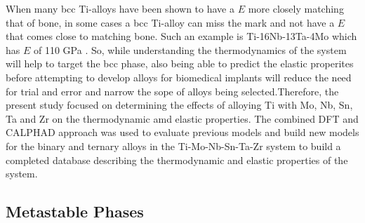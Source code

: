 When many bcc Ti-alloys have been shown to have a $E$ more closely matching that of bone, in some cases a bcc Ti-alloy can miss the mark and not have a $E$ that comes close to matching bone. Such an example is Ti-16Nb-13Ta-4Mo which has $E$ of 110 GPa \cite{Geetha2009}. So, while understanding the thermodynamics of the system will help to target the bcc phase, also being able to predict the elastic properites before attempting to develop alloys for biomedical implants will reduce the need for trial and error and narrow the sope of alloys being selected.Therefore, the present study focused on determining the effects of alloying Ti with Mo, Nb, Sn, Ta and Zr on the thermodynamic amd elastic properties. The combined DFT and CALPHAD approach was used to evaluate previous models and build new models for the binary and ternary alloys in the Ti-Mo-Nb-Sn-Ta-Zr system to build a completed database describing the thermodynamic and elastic properties of the system.

\subsection{Metastable Phases}

